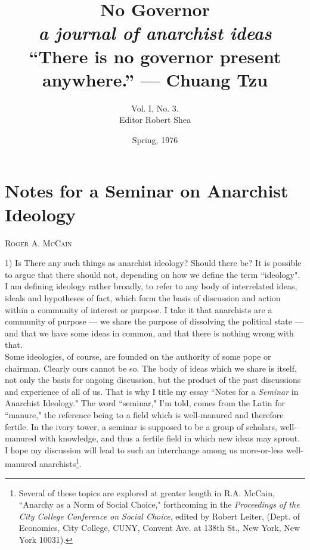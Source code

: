 \documentclass[12pt, onecolumn, letterpaper, oneside]{book}
\title{No Governor\\
		\large \textit{a journal of anarchist ideas}\\
		\vspace{2\baselineskip}
		\normalsize ``There is no governor present anywhere.'' --- Chuang Tzu
		}
\author{Vol. I, No. 3.\\Editor Robert Shea}
\date{Spring, 1976}
\makeatletter
\newcommand\chapterauthor[1]{\authortoc{#1}\printchapterauthor{#1}}
\newcommand{\printchapterauthor}[1]{%
  {\parindent0pt\vspace*{-25pt}%
  \linespread{1.1}\large\scshape#1%
  \par\nobreak\vspace*{35pt}}
  \@afterheading%
}
\newcommand{\authortoc}[1]{%
  \addtocontents{toc}{\vskip-10pt}%
  \addtocontents{toc}{%
    \protect\contentsline{chapter}%
    {\hskip1.3em\mdseries\scshape\protect\scriptsize#1}{}{}}
  \addtocontents{toc}{\vskip5pt}%
}
\makeatother
\begin{document}
\sloppy

\maketitle

\tableofcontents

\chapter{Notes for a Seminar on Anarchist Ideology}
\chapterauthor{Roger A. McCain}
1) Is There any such things as anarchist ideology? Should there be? It is possible to argue that there should not, depending on how we define the term ``ideology". I am defining ideology rather broadly, to refer to any body of interrelated ideas, ideals and hypotheses of fact, which form the basis of discussion and action within a community of interest or purpose. I take it that anarchists are a community of purpose --- we share the purpose of dissolving the political state --- and that we have some ideas in common, and that there is nothing wrong with that.\\
Some ideologies, of course, are founded on the authority of some pope or chairman. Clearly ours cannot be so. The body of ideas which we share is itself, not only the basis for ongoing discussion, but the product of the past discussions and experience of all of us. That is why I title my essay ``Notes for a \emph{Seminar} in Anarchist Ideology." The word ``seminar," I'm told, comes from the Latin for ``manure," the reference being to a field which is well-manured and therefore fertile. In the ivory tower, a seminar is supposed to be a group of scholars, well-manured with knowledge, and thus a fertile field in which new ideas may sprout. I hope my discussion will lead to such an interchange among us more-or-less well-manured anarchists\footnote{Several of these topics are explored at greater length in R.A. McCain, ``Anarchy as a Norm of Social Choice," forthcoming in the \emph{Proceedings of the City College Conference on Social Choice}, edited by Robert Leiter, (Dept. of Economics, City College, CUNY, Convent Ave. at 138th St., New York, New York 10031).}.\\
\end{document}
